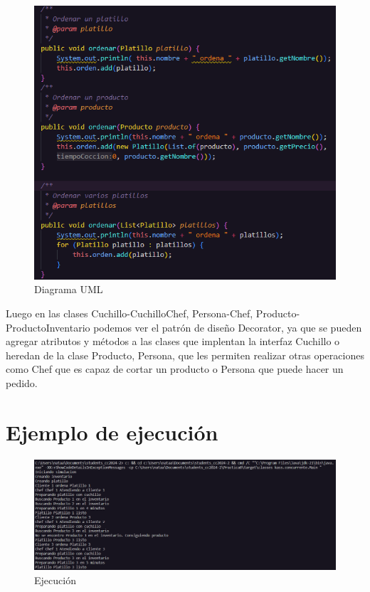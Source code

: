 \documentclass{article}
\begin{document}
\begin{figure}[h]
    \centering
    \includegraphics[width=\textwidth]{codigoPersona.png}
    \caption{Diagrama UML}
    \label{fig:UML}
\end{figure}

Luego en las clases Cuchillo-CuchilloChef, Persona-Chef, Producto-ProductoInventario podemos ver el patrón de diseño Decorator, ya que se pueden agregar atributos y métodos a las clases que implentan la interfaz Cuchillo o heredan de la clase Producto, Persona, que les permiten realizar otras operaciones como Chef que es capaz de cortar un producto o Persona que puede hacer un pedido.

\section{Ejemplo de ejecución}

\begin{figure}[h]
    \centering
    \includegraphics[width=\textwidth]{ejemploEjecucion.png}
    \caption{Ejecución}
    \label{fig:ejecucion}
\end{figure}
\end{document}
